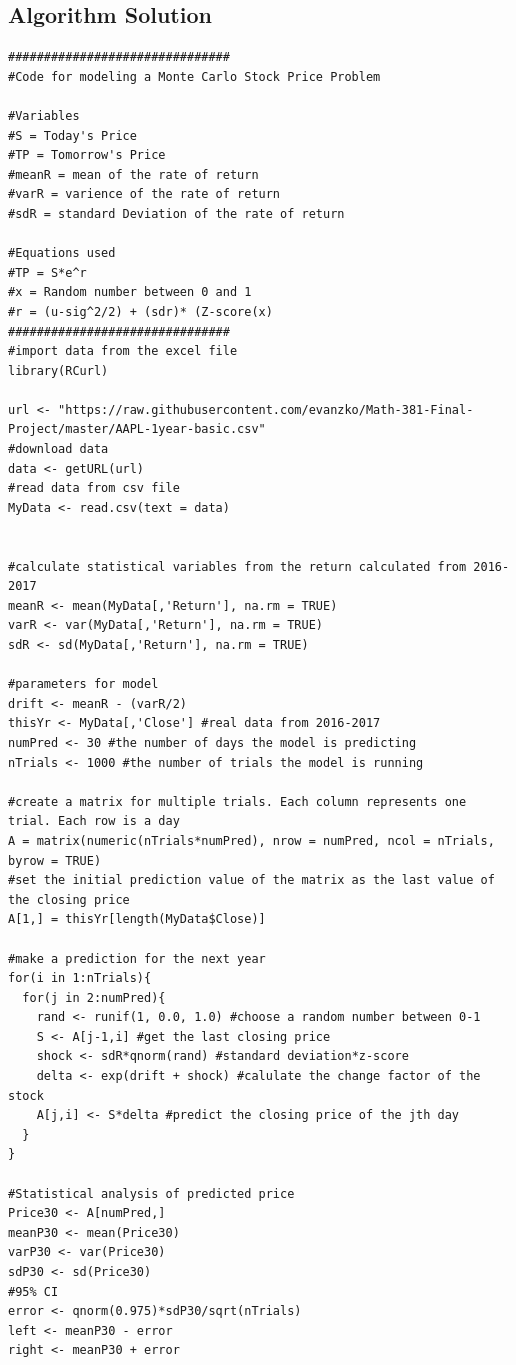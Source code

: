 \documentclass{article}
\begin{document}
\subsection{Algorithm Solution}
\begin{verbatim}
###############################
#Code for modeling a Monte Carlo Stock Price Problem

#Variables
#S = Today's Price
#TP = Tomorrow's Price
#meanR = mean of the rate of return
#varR = varience of the rate of return
#sdR = standard Deviation of the rate of return

#Equations used
#TP = S*e^r
#x = Random number between 0 and 1
#r = (u-sig^2/2) + (sdr)* (Z-score(x)
###############################
#import data from the excel file
library(RCurl)

url <- "https://raw.githubusercontent.com/evanzko/Math-381-Final-Project/master/AAPL-1year-basic.csv"
#download data
data <- getURL(url) 
#read data from csv file
MyData <- read.csv(text = data)


#calculate statistical variables from the return calculated from 2016-2017
meanR <- mean(MyData[,'Return'], na.rm = TRUE) 
varR <- var(MyData[,'Return'], na.rm = TRUE)
sdR <- sd(MyData[,'Return'], na.rm = TRUE)

#parameters for model
drift <- meanR - (varR/2)
thisYr <- MyData[,'Close'] #real data from 2016-2017 
numPred <- 30 #the number of days the model is predicting
nTrials <- 1000 #the number of trials the model is running

#create a matrix for multiple trials. Each column represents one trial. Each row is a day
A = matrix(numeric(nTrials*numPred), nrow = numPred, ncol = nTrials, byrow = TRUE)
#set the initial prediction value of the matrix as the last value of the closing price
A[1,] = thisYr[length(MyData$Close)]

#make a prediction for the next year
for(i in 1:nTrials){
  for(j in 2:numPred){
    rand <- runif(1, 0.0, 1.0) #choose a random number between 0-1
    S <- A[j-1,i] #get the last closing price
    shock <- sdR*qnorm(rand) #standard deviation*z-score
    delta <- exp(drift + shock) #calulate the change factor of the stock
    A[j,i] <- S*delta #predict the closing price of the jth day
  }
}

#Statistical analysis of predicted price
Price30 <- A[numPred,]
meanP30 <- mean(Price30)
varP30 <- var(Price30)
sdP30 <- sd(Price30)
#95% CI
error <- qnorm(0.975)*sdP30/sqrt(nTrials)
left <- meanP30 - error
right <- meanP30 + error

\end{verbatim}
\end{document}
